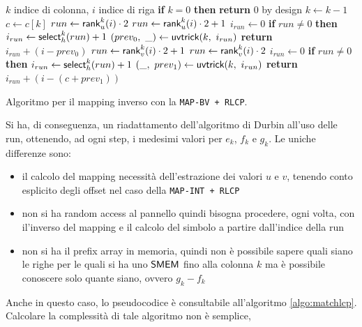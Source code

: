 \begin{algorithm}
  \begin{algorithmic}[1]
    \Comment $k$ indice di colonna, $i$ indice di riga
    \State \textbf{if} $k=0$ \textbf{then} \textbf{return} $0$
    \Comment by design
    \State $k\gets k-1$
    \State $c\gets c[k]$
    \State $run\gets \mbox{\rm {\sf rank}}_u^{k}(i)\cdot 2$
    \Else
    \State $run\gets \mbox{\rm {\sf rank}}_u^{k}(i)\cdot 2+1$
    \EndIf
    \State $i_{run}\gets 0$
    \State \textbf{if} $run\neq 0$ \textbf{then} $i_{run}\gets
    \mbox{\rm {\sf select}}_h^{k}(run)+1$ 
    \State $(prev_0,\,\,\_)\gets \mbox{\rm {\sf uvtrick}}(k,\,\,i_{run})$
    \State \textbf{return} $i_{run}+(i-prev_0)$
    \Else
    \State $run\gets \mbox{\rm {\sf rank}}_v^{k}(i)\cdot 2+1$
    \Else
    \State $run\gets \mbox{\rm {\sf rank}}_v^{k}(i)\cdot 2$
    \EndIf
    \State $i_{run}\gets 0$
    \State \textbf{if} $run\neq 0$ \textbf{then} $i_{run}\gets
    \mbox{\rm {\sf select}}_h^{k}(run)+1$ 
    \State $(\_,\,\,prev_1)\gets \mbox{\rm {\sf uvtrick}}(k,\,\,i_{run})$
    \State \textbf{return} $i_{run}+(i-(c+prev_1))$
    \EndIf
    \EndFunction
  \end{algorithmic}
  \caption{Algoritmo per il mapping inverso con la \texttt{MAP-BV + RLCP}.}
  \label{algo:lfrevbv}
\end{algorithm}
Si ha, di conseguenza, un riadattamento dell'algoritmo di Durbin all'uso delle
run, 
ottenendo, ad ogni step, i medesimi valori per $e_k$, $f_k$ e $g_k$. Le uniche
differenze sono:
\begin{itemize}
  \item il calcolo del mapping necessità dell'estrazione dei valori $u$ e $v$,
  tenendo conto esplicito degli offset nel caso della \texttt{MAP-INT + RLCP}
  \item non si ha random access al pannello quindi bisogna procedere,
  ogni volta, con il'inverso del mapping e il calcolo del simbolo a partire
  dall'indice della run
  \item non si ha il prefix array in memoria, quindi non è possibile
  sapere quali siano le righe per le quali si ha uno $\mbox{\rm {\sf SMEM}}$ fino alla colonna
  $k$ ma è possibile conoscere solo quante siano, ovvero $g_k-f_k$
\end{itemize}
Anche in questo caso, lo pseudocodice è consultabile all'algoritmo
\ref{algo:matchlcp}. Calcolare la complessità di tale algoritmo non è semplice,
